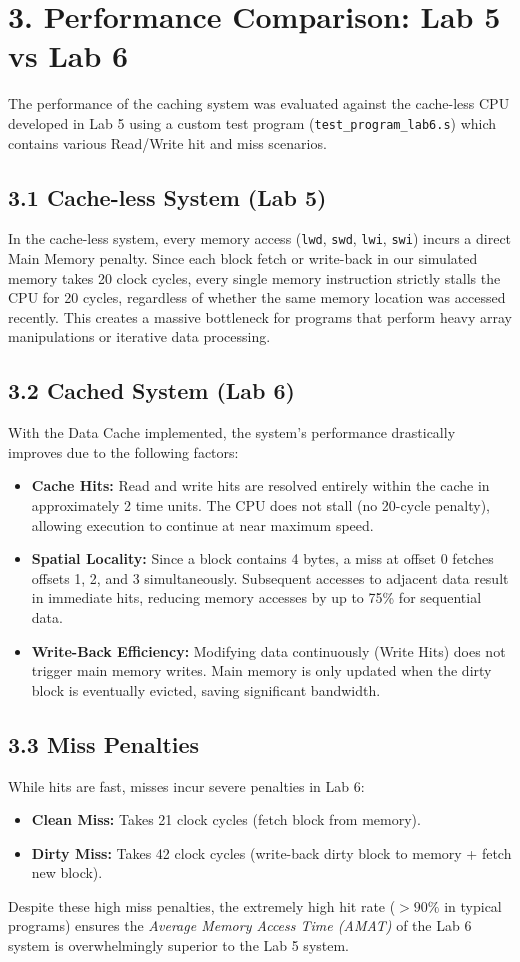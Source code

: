 \documentclass[12pt,a4paper]{article}
\begin{document}
\section*{3. Performance Comparison: Lab 5 vs Lab 6}
The performance of the caching system was evaluated against the cache-less CPU developed in Lab 5 using a custom test program (\texttt{test\_program\_lab6.s}) which contains various Read/Write hit and miss scenarios.

\subsection*{3.1 Cache-less System (Lab 5)}
In the cache-less system, every memory access (\texttt{lwd}, \texttt{swd}, \texttt{lwi}, \texttt{swi}) incurs a direct Main Memory penalty. Since each block fetch or write-back in our simulated memory takes 20 clock cycles, every single memory instruction strictly stalls the CPU for 20 cycles, regardless of whether the same memory location was accessed recently. This creates a massive bottleneck for programs that perform heavy array manipulations or iterative data processing.

\subsection*{3.2 Cached System (Lab 6)}
With the Data Cache implemented, the system's performance drastically improves due to the following factors:
\begin{itemize}
    \item \textbf{Cache Hits:} Read and write hits are resolved entirely within the cache in approximately 2 time units. The CPU does not stall (no 20-cycle penalty), allowing execution to continue at near maximum speed.
    \item \textbf{Spatial Locality:} Since a block contains 4 bytes, a miss at offset 0 fetches offsets 1, 2, and 3 simultaneously. Subsequent accesses to adjacent data result in immediate hits, reducing memory accesses by up to 75\% for sequential data.
    \item \textbf{Write-Back Efficiency:} Modifying data continuously (Write Hits) does not trigger main memory writes. Main memory is only updated when the dirty block is eventually evicted, saving significant bandwidth.
\end{itemize}

\subsection*{3.3 Miss Penalties}
While hits are fast, misses incur severe penalties in Lab 6:
\begin{itemize}
    \item \textbf{Clean Miss:} Takes 21 clock cycles (fetch block from memory).
    \item \textbf{Dirty Miss:} Takes 42 clock cycles (write-back dirty block to memory + fetch new block).
\end{itemize}
Despite these high miss penalties, the extremely high hit rate ($>90\%$ in typical programs) ensures the \textit{Average Memory Access Time (AMAT)} of the Lab 6 system is overwhelmingly superior to the Lab 5 system.
\end{document}
